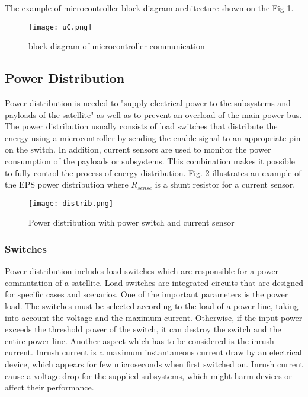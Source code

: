 The example of microcontroller block diagram architecture shown on the Fig \ref{fig: EPS4121}.
\begin{figure}[h]
	\centering
	\texttt{[image: uC.png]}
	\caption{block diagram of microcontroller communication}
	\label{fig: EPS4121}
\end{figure}

\subsection{Power Distribution \label{sec:tech}}

Power distribution is needed to \cite{21} "supply electrical power to the subsystems and payloads of the satellite" as well as to prevent an overload of the main power bus. The power distribution usually consists of load switches that distribute the energy using a microcontroller by sending the enable signal to an appropriate pin on the switch. In addition, current sensors are used to monitor the power consumption of the payloads or subsystems. This combination makes it possible to fully control the process of energy distribution. Fig. \ref{fig: EPS111} illustrates an example of the EPS power distribution where $R_{sense}$ is a shunt resistor for a current sensor. 


\begin{figure}[h]
	\centering
	\texttt{[image: distrib.png]}
	\caption{Power distribution with power switch and current sensor}
	\label{fig: EPS111}
\end{figure}

\newpage

\subsubsection{Switches}
Power distribution includes load switches which are responsible for a power commutation of a satellite. Load switches are integrated circuits that are designed for specific cases and scenarios. One of the important parameters is the power load. The switches must be selected according to the load of a power line, taking into account the voltage and the maximum current. Otherwise, if the input power exceeds the threshold power of the switch, it can destroy the switch and the entire power line.  Another aspect which has to be considered is the inrush current. Inrush current is a maximum instantaneous current draw by an electrical device, which appears for few microseconds when first switched on. Inrush current cause a voltage drop for the supplied subsystems, which might harm devices or affect their performance.

